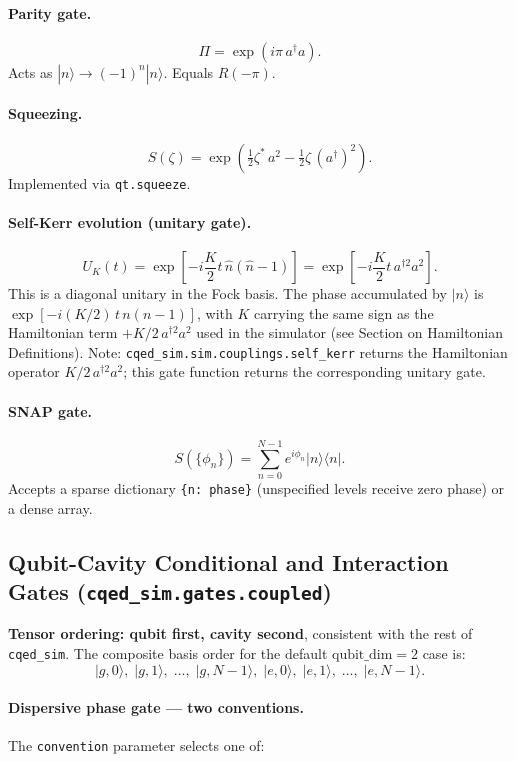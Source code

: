 \documentclass[11pt]{article}
\begin{document}
\paragraph{Parity gate.}
\[
  \Pi = \exp(i\pi\,a^\dagger a).
\]
Acts as \(|n\rangle \to (-1)^n|n\rangle\).  Equals \(R(-\pi)\).

\paragraph{Squeezing.}
\[
  S(\zeta) = \exp\!\left(\tfrac{1}{2}\zeta^*\,a^2 - \tfrac{1}{2}\zeta\,(a^\dagger)^2\right).
\]
Implemented via \texttt{qt.squeeze}.

\paragraph{Self-Kerr evolution (unitary gate).}
\[
  U_K(t) = \exp\!\left[-i\frac{K}{2}t\,\hat{n}(\hat{n}-1)\right]
           = \exp\!\left[-i\frac{K}{2}t\,a^{\dagger 2}a^2\right].
\]
This is a diagonal unitary in the Fock basis. The phase accumulated by
\(|n\rangle\) is \(\exp[-i(K/2)\,t\,n(n-1)]\), with \(K\) carrying the
same sign as the Hamiltonian term \(+K/2\,a^{\dagger 2}a^2\) used in the
simulator (see Section on Hamiltonian Definitions). Note: \texttt{cqed\_sim.sim.couplings.self\_kerr}
returns the Hamiltonian operator \(K/2\,a^{\dagger 2}a^2\); this gate function
returns the corresponding unitary gate.

\paragraph{SNAP gate.}
\[
  S(\{\phi_n\}) = \sum_{n=0}^{N-1} e^{i\phi_n}|n\rangle\langle n|.
\]
Accepts a sparse dictionary \texttt{\{n: phase\}} (unspecified levels receive
zero phase) or a dense array.

\subsection{Qubit-Cavity Conditional and Interaction Gates
            (\texttt{cqed\_sim.gates.coupled})}
\label{subsec:coupled_gates}

\noindent
\textbf{Tensor ordering: qubit first, cavity second}, consistent with the
rest of \texttt{cqed\_sim}. The composite basis order for the default
\(\text{qubit\_dim}=2\) case is:
\[
  |g,0\rangle,\;|g,1\rangle,\;\ldots,\;|g,N-1\rangle,\;
  |e,0\rangle,\;|e,1\rangle,\;\ldots,\;|e,N-1\rangle.
\]

\paragraph{Dispersive phase gate — two conventions.}
The \texttt{convention} parameter selects one of:
\end{document}
